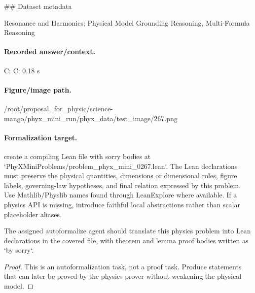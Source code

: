 \#\# Dataset metadata

Resonance and Harmonics; Physical Model Grounding Reasoning, Multi-Formula Reasoning

\paragraph{Recorded answer/context.}
C: C: 0.18 s

\paragraph{Figure/image path.}
/root/proposal\_for\_physic/science-mango/phyx\_mini\_run/phyx\_data/test\_image/267.png

\paragraph{Formalization target.}
create a compiling Lean file with sorry bodies at `PhyXMiniProblems/problem\_phyx\_mini\_0267.lean`. The Lean declarations must preserve the physical quantities, dimensions or dimensional roles, figure labels, governing-law hypotheses, and final relation expressed by this problem.
Use Mathlib/Physlib names found through LeanExplore where available. If a physics API is missing, introduce faithful local abstractions rather than scalar placeholder aliases.

\begin{theorem}
\label{thm:physics:phyx_mini_0267:target}
The assigned autoformalize agent should translate this physics problem into Lean declarations in the covered file, with theorem and lemma proof bodies written as `by sorry`.
\end{theorem}
\begin{proof}
This is an autoformalization task, not a proof task. Produce statements that can later be proved by the physics prover without weakening the physical model.
\end{proof}

